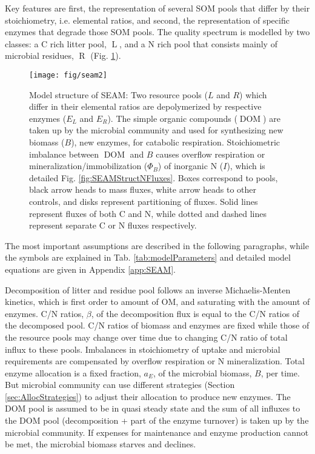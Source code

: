 Key features are first, the representation of several SOM pools that differ by
their stoichiometry, i.e. elemental ratios, and second, the representation of
specific enzymes that degrade those SOM pools. The quality spectrum is modelled by two
classes: a C rich litter pool,
$\operatorname{L}$, and a N rich pool that consists
mainly of microbial residues, $\operatorname{R}$ (Fig. \ref{fig:SEAMStruct}).

\begin{figure}[t] \vspace*{2mm}
\begin{center}
\texttt{[image: fig/seam2]}
\end{center}
\caption{
Model structure of SEAM: Two resource pools ($L$ and $R$) which differ in their
elemental ratios are depolymerized by respective enzymes ($E_L$ and $E_R$). The
simple organic compounds ($\operatorname{DOM}$) are taken up by the microbial
community  and used for synthesizing new biomass (${B}$), new enzymes, for
catabolic respiration. Stoichiometric imbalance between $\operatorname{DOM}$ and ${B}$
causes overflow respiration or mineralization/immobilization ($\Phi_B$) of
inorganic N ($I$), which is detailed Fig. \ref{fig:SEAMStructNFluxes}. Boxes
correspond to pools, black arrow heads to mass fluxes, white arrow heads to other controls, and disks represent partitioning of fluxes. Solid lines
represent fluxes of both C and N, while dotted and dashed lines represent
separate C or N fluxes respectively.
\label{fig:SEAMStruct}
}
\end{figure}

The most important assumptions are described in the following paragraphs, while
the symbols are explained in Tab. \ref{tab:modelParameters} and detailed model
equations are given in Appendix \ref{app:SEAM}. 

 

Decomposition of litter and residue pool follows an inverse Michaelis-Menten
kinetics, which is first order to amount of OM, and saturating with the amount
of enzymes. C/N ratios, $\beta$, of the decomposition flux is equal to the C/N
ratios of the decomposed pool. C/N ratios of biomass and enzymes are fixed while
those of the resource pools may change over time due to changing C/N ratio of
total influx to these pools. Imbalances in stoichiometry of uptake and microbial
requirements are compensated by overflow respiration or N mineralization.
Total enzyme allocation is a fixed fraction, $a_E$, of the microbial biomass,
$B$, per time. But microbial community can use different strategies (Section
\ref{sec:AllocStrategies}) to adjust their allocation to produce new enzymes.
The DOM pool is assumed to be in quasi steady state and the sum of all
influxes to the DOM pool (decomposition + part of the enzyme turnover) is taken
up by the microbial community. If expenses for maintenance and enzyme production
cannot be met, the microbial biomass starves and declines.

